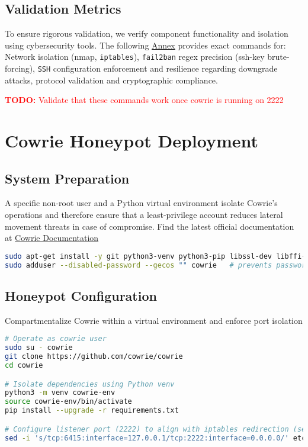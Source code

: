 \documentclass{cls/ULBreport}
\newcommand{\todo}[1]{\textcolor{red}{\textbf{TODO:} #1}}
\begin{document}


        \subsection{Validation Metrics}  
        \label{sec:validation}  
        
        To ensure rigorous validation, we verify component functionality and isolation using cybersecurity tools. The following \hyperref[annexes:network]{Annex} provides exact commands for:  Network isolation (nmap, \texttt{iptables}), \texttt{fail2ban} regex precision (ssh-key brute-forcing), \texttt{SSH} configuration enforcement and resilience regarding downgrade attacks, protocol validation and cryptographic compliance.
        
    \todo{Validate that these commands work once cowrie is running on 2222}


    \section{Cowrie Honeypot Deployment}
\label{sec:cowrie}
    \subsection{System Preparation}
    A specific non-root user and a Python virtual environment isolate Cowrie's operations and therefore ensure that a least-privilege account reduces lateral movement threats in case of compromise. Find the latest official documentation at \href{https://docs.cowrie.org/en/latest/INSTALL.html}{Cowrie Documentation}
    \begin{lstlisting}[language=bash,caption={Cowrie User Creation}]
sudo apt-get install -y git python3-venv python3-pip libssl-dev libffi-dev build-essential libpython3-dev authbind # to bind privileged ports without root priv
sudo adduser --disabled-password --gecos "" cowrie   # prevents password-based connections 
    \end{lstlisting}

    \subsection{Honeypot Configuration}
    Compartmentalize Cowrie within a virtual environment and enforce port isolation
    \begin{lstlisting}[language=bash,caption={Cowrie Honeypot Setup}]
# Operate as cowrie user
sudo su - cowrie  
git clone https://github.com/cowrie/cowrie  
cd cowrie  

# Isolate dependencies using Python venv
python3 -m venv cowrie-env  
source cowrie-env/bin/activate  
pip install --upgrade -r requirements.txt  

# Configure listener port (2222) to align with iptables redirection (section 2.3)
sed -i 's/tcp:6415:interface=127.0.0.1/tcp:2222:interface=0.0.0.0/' etc/cowrie.cfg  
    \end{lstlisting}
\end{document}
